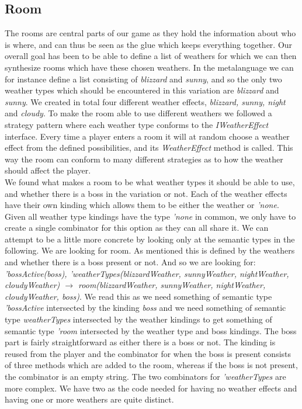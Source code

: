 \subsection{Room}\label{Room}
The rooms are central parts of our game as they hold the information about who is where, and can thus be seen as the glue which keeps everything together. Our overall goal has been to be able to define a list of weathers for which we can then synthesize rooms which have these chosen weathers. In the metalanguage we can for instance define a list consisting of \textit{blizzard} and \textit{sunny}, and so the only two weather types which should be encountered in this variation are \textit{blizzard} and \textit{sunny}. We created in total four different weather effects, \textit{blizzard, sunny, night} and \textit{cloudy}. To make the room able to use different weathers we followed a strategy pattern where each weather type conforms to the \textit{IWeatherEffect} interface. Every time a player enters a room it will at random choose a weather effect from the defined possibilities, and its \textit{WeatherEffect} method is called. This way the room can conform to many different strategies as to how the weather should affect the player. \\
We found what makes a room to be what weather types it should be able to use, and whether there is a boss in the variation or not. Each of the weather effects have their own kinding which allows them to be either the weather or \textit{'none}. Given all weather type kindings have the type \textit{'none} in common, we only have to create a single combinator for this option as they can all share it. We can attempt to be a little more concrete by looking only at the semantic types in the following. We are looking for room. As mentioned this is defined by the weathers and whether there is a boss present or not. And so we are looking for: \textit{'bossActive(boss), 'weatherTypes(blizzardWeather, sunnyWeather, nightWeather, cloudyWeather) $\to$ room(blizzardWeather, sunnyWeather, nightWeather, cloudyWeather, boss)}. We read this as we need something of semantic type \textit{'bossActive} intersected by the kinding \textit{boss} and we need something of semantic type \textit{weatherTypes} intersected by the weather kindings to get something of semantic type \textit{'room} intersected by the weather type and boss kindings. The boss part is fairly straightforward as either there is a boss or not. The kinding is reused from the player and the combinator for when the boss is present consists of three methods which are added to the room, whereas if the boss is not present, the combinator is an empty string. The two combinators for \textit{'weatherTypes} are more complex. We have two as the code needed for having no weather effects and having one or more weathers are quite distinct.


